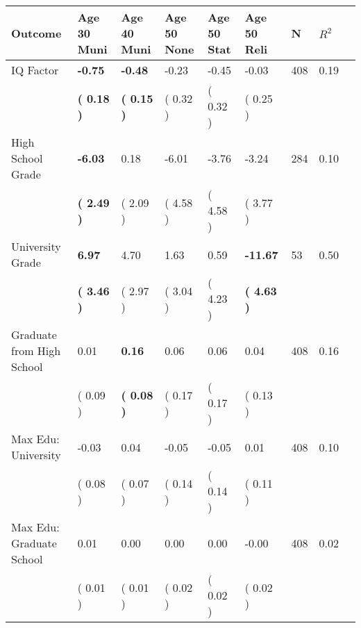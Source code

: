 \begin{tabular}{L{6.2cm} C{1.8cm} C{1.8cm} C{1.8cm} C{1.8cm} C{1.8cm} C{1.8cm} C{0.3cm} C{0.3cm}}
\toprule
 \textbf{Outcome} & \textbf{Age 30 Muni} & \textbf{Age 40 Muni} & \textbf{Age 50 None} & \textbf{Age 50 Stat} & \textbf{Age 50 Reli} & \textbf{N} & \textbf{$ R^2$} \\
\midrule
IQ Factor & \textbf{    -0.75} & \textbf{    -0.48} &     -0.23 &     -0.45 &     -0.03  & 408 &       0.19 \\ 
 & \textbf{(     0.18 )} & \textbf{(     0.15 )} & (     0.32 ) & (     0.32 ) & (     0.25 )  & \\
High School Grade & \textbf{    -6.03} &      0.18 &     -6.01 &     -3.76 &     -3.24  & 284 &       0.10 \\ 
 & \textbf{(     2.49 )} & (     2.09 ) & (     4.58 ) & (     4.58 ) & (     3.77 )  & \\
University Grade & \textbf{     6.97} &      4.70 &      1.63 &      0.59 & \textbf{   -11.67}  & 53 &       0.50 \\ 
 & \textbf{(     3.46 )} & (     2.97 ) & (     3.04 ) & (     4.23 ) & \textbf{(     4.63 )}  & \\
Graduate from High School &      0.01 & \textbf{     0.16} &      0.06 &      0.06 &      0.04  & 408 &       0.16 \\ 
 & (     0.09 ) & \textbf{(     0.08 )} & (     0.17 ) & (     0.17 ) & (     0.13 )  & \\
Max Edu: University &     -0.03 &      0.04 &     -0.05 &     -0.05 &      0.01  & 408 &       0.10 \\ 
 & (     0.08 ) & (     0.07 ) & (     0.14 ) & (     0.14 ) & (     0.11 )  & \\
Max Edu: Graduate School &      0.01 &      0.00 &      0.00 &      0.00 &     -0.00  & 408 &       0.02 \\ 
 & (     0.01 ) & (     0.01 ) & (     0.02 ) & (     0.02 ) & (     0.02 )  & \\
\bottomrule
\end{tabular}
